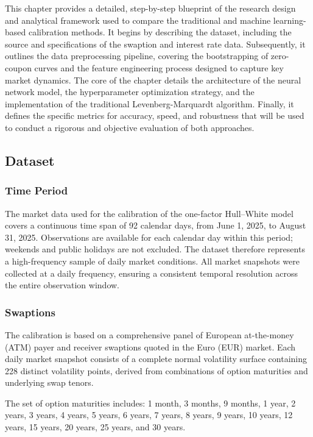 This chapter provides a detailed, step-by-step blueprint of the research design and analytical framework used to compare the traditional and machine learning-based calibration methods. It begins by describing the dataset, including the source and specifications of the swaption and interest rate data. Subsequently, it outlines the data preprocessing pipeline, covering the bootstrapping of zero-coupon curves and the feature engineering process designed to capture key market dynamics. The core of the chapter details the architecture of the neural network model, the hyperparameter optimization strategy, and the implementation of the traditional Levenberg-Marquardt algorithm. Finally, it defines the specific metrics for accuracy, speed, and robustness that will be used to conduct a rigorous and objective evaluation of both approaches.

\subsection{Dataset}
\subsubsection{Time Period}
The market data used for the calibration of the one-factor Hull–White model covers a continuous time span of 92 calendar days, from June 1, 2025, to August 31, 2025. Observations are available for each calendar day within this period; weekends and public holidays are not excluded. The dataset therefore represents a high-frequency sample of daily market conditions. All market snapshots were collected at a daily frequency, ensuring a consistent temporal resolution across the entire observation window.

\subsubsection{Swaptions}
The calibration is based on a comprehensive panel of European at-the-money (ATM) payer and receiver swaptions quoted in the Euro (EUR) market. Each daily market snapshot consists of a complete normal volatility surface containing 228 distinct volatility points, derived from combinations of option maturities and underlying swap tenors.

The set of option maturities includes:
1 month, 3 months, 9 months, 1 year, 2 years, 3 years, 4 years, 5 years, 6 years, 7 years, 8 years, 9 years, 10 years, 12 years, 15 years, 20 years, 25 years, and 30 years.

